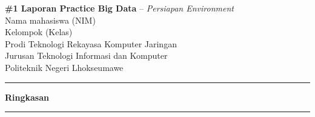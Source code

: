 \documentclass[a4paper,12pt]{article}
\renewenvironment{abstract}				%
 {\par\noindent\textbf{Ringkasan}\ \ignorespaces \\}
 {\par\noindent\medskip}
\begin{document}
\pagestyle{fancy}
\thispagestyle{empty}
\fancyhead[L]{}
\renewcommand*{\thefootnote}{\fnsymbol{footnote}}

\begin{center}
\Large{\textbf{\#1 Laporan Practice Big Data} -- \textit{Persiapan Environment}}
\vspace{0.4cm}
\normalsize \\ 
Nama mahasiswa (NIM) \\
Kelompok (Kelas) \\
\vspace{0.1cm}
\small{Prodi Teknologi Rekayasa Komputer Jaringan} \\
\small{Jurusan Teknologi Informasi dan Komputer} \\
\small{Politeknik Negeri Lhokseumawe}
\medskip
\normalsize
\end{center}

{\color{gray}\hrule}
\vspace{0.4cm}
\begin{abstract} 								%

\end{abstract}
{\color{gray}\hrule}
\medskip

\end{document}
